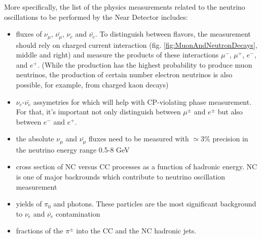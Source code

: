 More specifically, the list of the physics measurements related to the neutrino oscillations to be performed by the Near Detector includes:
\begin{itemize}
  \item fluxes of $\nu_\mu$, $\bar{\nu_\mu}$, $\nu_e$ and $\bar{\nu_e}$. To distinguish between flavors, the measurement should rely on charged current interaction (fig. \ref{fig:MuonAndNeutronDecays}, middle and right) and measure the products of these interactions $\mu^-$, $\mu^+$, $e^-$, and $e^+$. (While the production has the highest probability to produce muon neutrinos, the production of certain number electron neutrinos is also possible, for example, from charged kaon decays)
  \item $\nu_e$-$\bar{\nu_e}$ assymetries for which will help with CP-violating phase measurement. For that, it's important not only distinguish between $\mu^\pm$ and $e^\pm$ but also between $e^-$ and $e^+$.
  \item the absolute $\nu_\mu$ and $\bar{\nu_\mu}$ fluxes need to be measured with $\simeq{3\%}$ precision in the neutrino energy range 0.5-8 GeV
  \item cross section of NC versus CC processes as a function of hadronic energy. NC is one of major backrounds which contribute to neutrino oscillation measurement
  \item yields of $\pi_0$ and photons. These particles are the most significant background to $\nu_e$ and $\bar{\nu_e}$ contamination
  \item fractions of the $\pi^\pm$ into the CC and the NC hadronic jets.    
\end{itemize} 


